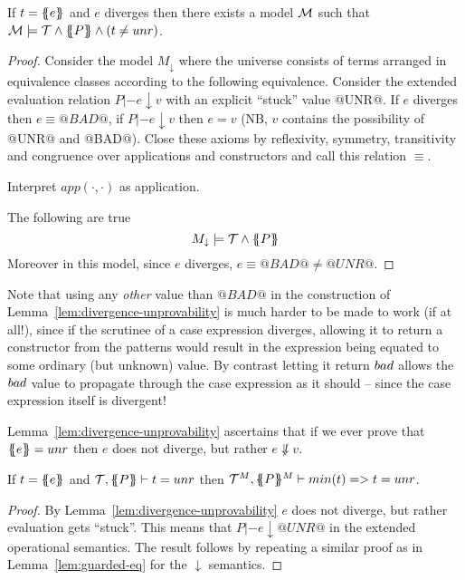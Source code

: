 \documentclass[preprint]{sigplanconf}
\begin{document}
\begin{lemma}\label{lem:divergence-unprovability}
If $t = \{\!\!\{{e}\}\!\!\}$ and $e$ diverges then there exists a model
${\cal M}$ such that ${\cal M} \models {\cal T} \land \{\!\!\{P\}\!\!\} \land (t \neq \mathop{unr})$.
\end{lemma}
\begin{proof} Consider the model $M_\downarrow$ where the universe consists of terms 
arranged in equivalence classes according to the following equivalence. Consider the extended
evaluation relation $P |- e \downarrow v$ with an explicit ``stuck'' value @UNR@. If $e$ diverges 
then $e \equiv @BAD@$, if $P |- e \downarrow v$ then $e = v$ (NB, $v$ contains the possibility of
@UNR@ and @BAD@). Close these axioms by reflexivity, symmetry, transitivity and congruence over 
applications and constructors and call this relation $\equiv$.

Interpret $app(\cdot,\cdot)$ as application.

The following are true
\[ M_{\downarrow} \models {\cal T} \land \{\!\!\{P\}\!\!\} \]
Moreover in this model, since $e$ diverges, $e \equiv @BAD@ \neq @UNR@$.
\end{proof}

Note that using any {\em other} value than $@BAD@$ in the construction of Lemma~\ref{lem:divergence-unprovability}
is much harder to be made to work (if at all!), since if the scrutinee of a case expression diverges, 
allowing it to return a constructor from the patterns would result in the expression being equated to some 
ordinary (but unknown) value. By contrast letting it return $\mathop{bad}$ allows the $\mathop{bad}$ value to propagate 
through the case expression as it should -- since the case expression itself is divergent!

Lemma~\ref{lem:divergence-unprovability} ascertains that if we ever prove that $\{\!\!\{{e}\}\!\!\} = \mathop{unr}$ then
$e$ does not diverge, but rather $e \not\Downarrow v$. 


\begin{lemma}\label{lem:guarded-unr}
If $t = \{\!\!\{{e}\}\!\!\}$ and 
   ${\cal T} , \{\!\!\{P\}\!\!\} \vdash t = \mathop{unr}$ then 
   ${\cal T}^M , \{\!\!\{P\}\!\!\}^M \vdash min(t) => t = \mathop{unr}$.
\end{lemma}
\begin{proof}
By Lemma~\ref{lem:divergence-unprovability} $e$ does not diverge, but rather evaluation gets ``stuck''. This 
means that $P |- e \downarrow @UNR@$ in the extended operational semantics. The result follows by repeating a 
similar proof as in Lemma~\ref{lem:guarded-eq} for the $\downarrow$ semantics.
\end{proof}
\end{document}
